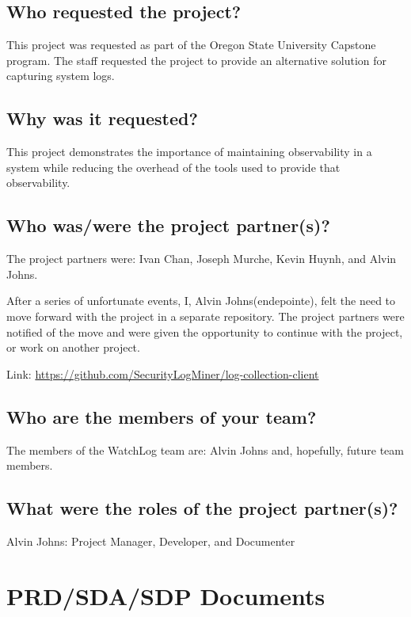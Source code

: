 \documentclass{article}
\begin{document}
\subsection{Who requested the project?}

This project was requested as part of the Oregon State University Capstone program. The staff requested the project to provide an alternative solution for capturing system logs.

\subsection{Why was it requested?}

This project demonstrates the importance of maintaining observability in a system while reducing the overhead of the tools used to provide that observability.

\subsection{Who was/were the project partner(s)?}

The project partners were: Ivan Chan, Joseph Murche, Kevin Huynh, and Alvin Johns.\vspace{0.25cm}

After a series of unfortunate events, I, Alvin Johns(endepointe), felt the need to move forward with the project in a separate repository. The project partners were notified of the move and were given the opportunity to continue with the project, or work on another project.\vspace{0.25cm}

Link: \url{https://github.com/SecurityLogMiner/log-collection-client}

\subsection{Who are the members of your team?}

The members of the WatchLog team are: Alvin Johns and, hopefully, future team members.

\subsection{What were the roles of the project partner(s)?}

Alvin Johns: Project Manager, Developer, and Documenter

\newpage

\section{PRD/SDA/SDP Documents}
\end{document}
